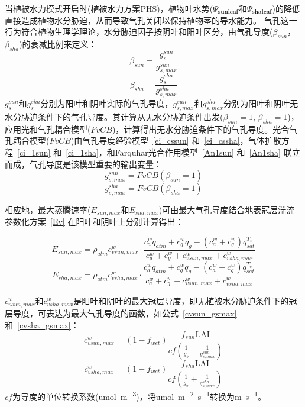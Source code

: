 当植被水力模式开启时(植被水力方案PHS)，植物叶水势($\Psi_{\mathbf{sunleaf}}$和$\Psi_{\mathbf{shaleaf}}$)的降低直接造成植物水分胁迫，从而导致气孔关闭以保持植物茎的导水能力。
气孔这一行为符合植物生理学理论，水分胁迫因子按阴叶和阳叶区分，由气孔导度($\beta_{sun}$，$\beta_{sha}$)的衰减比例来定义：
\begin{equation}\label{beta_sun}
\beta_{sun}=\frac{g_{s}^{sun}}{g_{s,max}^{sun}}
\end{equation}
\begin{equation}\label{beta_sha}
\beta_{sha}=\frac{g_{s}^{sha}}{g_{s,max}^{sha}}
\end{equation}
$g_{s}^{sun}$和$g_{s}^{sha}$分别为阳叶和阴叶实际的气孔导度，$g_{s,max}^{sun}$和$g_{s,max}^{sha}$分别为阳叶和阴叶无水分胁迫条件下的气孔导度。其计算从无水分胁迫条件出发($\beta_{sun}=1$, $\beta_{sha}=1$)，应用光和气孔耦合模型($FvCB$)，计算得出无水分胁迫条件下的气孔导度。光合气孔耦合模型($FvCB$)由气孔导度经验模型~\eqref{ei_cssun} 和~\eqref{ei_cssha}，气体扩散方程~\eqref{ci_1sun} 和~\eqref{ci_1sha}，和Farquhar光合作用模型~\eqref{An1sun} 和~\eqref{An1sha} 联立而成，气孔导度是该模型重要的输出变量：
\begin{equation}\label{gs_sunmax}
g_{s,max}^{sun}=FvCB\left(\beta_{sun}=1\right)
\end{equation}
\begin{equation}\label{gs_shamax}
g_{s,max}^{sha}=FvCB\left(\beta_{sha}=1\right)
\end{equation}


相应地，最大蒸腾速率($E_{sun,max}$和$E_{sha,max}$)可由最大气孔导度结合地表冠层湍流参数化方案~\eqref{Ev} 在阳叶和阴叶上分别计算得出：

\begin{equation}\label{E_sunmax}
E_{sun,max}=\rho_{atm} c_{vsun,max}^{w} \cdot \frac{c_{a}^{w} q_{atm}+c_{g}^{w} q_{g}-
\left(c_{a}^{w}+c_{g}^{w}\right) q_{s a t}^{T_{v}}}{c_{a}^{w}+c_{g}^{w}+c_{vsun,max}^{w}+c_{vsha,max}^{w}}
\end{equation}
%
\begin{equation}\label{Eshamax}
E_{sha,max}=\rho_{atm} c_{vsha,max}^{w} \cdot \frac{c_{a}^{w} q_{atm}+c_{g}^{w} q_{g}-
\left(c_{a}^{w}+c_{g}^{w}\right) q_{s a t}^{T_{v}}}{c_{a}^{w}+c_{g}^{w}+c_{vsun,max}^{w}+c_{vsha,max}^{w}}
\end{equation}


$c_{vsun,max}^{w}$和$c_{vsha,max}^{w}$是阳叶和阴叶的最大冠层导度，即无植被水分胁迫条件下的冠层导度，可表达为最大气孔导度的函数，如公式~\eqref{cvsun_gsmax} 和~\eqref{cvsha_gsmax}：
\begin{equation}\label{cvsun_gsmax}
    c_{vsun,max}^{w}=\left(1-f_{wet}\right)\frac{f_{sun}\text{LAI}}{cf\left(\frac{1}{g_b}+\frac{1}{g_{s,max}^{sun}}\right)}
\end{equation}
%
\begin{equation}\label{cvsha_gsmax}
    c_{vsha,max}^{w}=\left(1-f_{wet}\right)\frac{f_{sha}\text{LAI}}{cf\left(\frac{1}{g_b}+\frac{1}{g_{s,max}^{sha}}\right)}
\end{equation}
$cf$为导度的单位转换系数(\unit{umol.m^{-3}})，将\unit{umol.m^{-2}.s^{-1}}转换为\unit{m.s^{-1}}。

